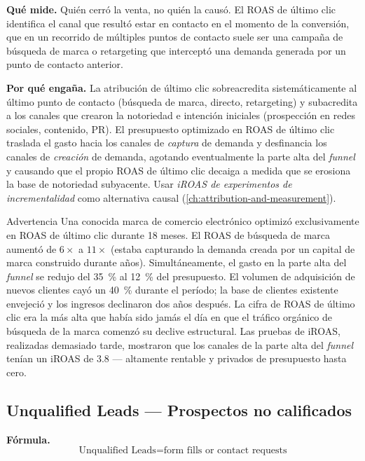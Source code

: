 \textbf{Qué mide.} Quién cerró la venta, no quién la causó. El ROAS de último clic
identifica el canal que resultó estar en contacto en el momento de la conversión, que en un
recorrido de múltiples puntos de contacto suele ser una campaña de búsqueda de marca o
retargeting que interceptó una demanda generada por un punto de contacto anterior.

\textbf{Por qué engaña.} La atribución de último clic sobreacredita sistemáticamente al
último punto de contacto (búsqueda de marca, directo, retargeting) y subacredita a los
canales que crearon la notoriedad e intención iniciales (prospección en redes sociales,
contenido, PR). El presupuesto optimizado en ROAS de último clic traslada el gasto hacia
los canales de \emph{captura} de demanda y desfinancia los canales de \emph{creación} de
demanda, agotando eventualmente la parte alta del \emph{funnel} y causando que el propio ROAS
de último clic decaiga a medida que se erosiona la base de notoriedad subyacente. Usar
\emph{iROAS de experimentos de incrementalidad} como alternativa causal
(\cref{ch:attribution-and-measurement}).

\begin{admonition}{Advertencia}
Una conocida marca de comercio electrónico optimizó exclusivamente en ROAS de último clic
durante 18 meses. El ROAS de búsqueda de marca aumentó de $6\times$ a $11\times$ (estaba
capturando la demanda creada por un capital de marca construido durante años).
Simultáneamente, el gasto en la parte alta del \emph{funnel} se redujo del \qty{35}{\percent}
al \qty{12}{\percent} del presupuesto. El volumen de adquisición de nuevos clientes cayó un
\qty{40}{\percent} durante el período; la base de clientes existente envejeció y los ingresos
declinaron dos años después. La cifra de ROAS de último clic era la más alta que había sido
jamás el día en que el tráfico orgánico de búsqueda de la marca comenzó su declive
estructural. Las pruebas de iROAS, realizadas demasiado tarde, mostraron que los canales de
la parte alta del \emph{funnel} tenían un iROAS de 3.8 --- altamente rentable y privados de
presupuesto hasta cero.
\end{admonition}


\subsection{Unqualified Leads --- Prospectos no calificados}

\textbf{Fórmula.}
\[
  \text{Unqualified Leads} = \text{form fills or contact requests}
\]


